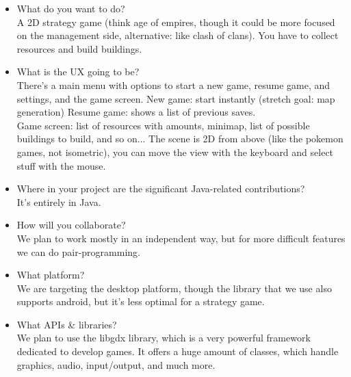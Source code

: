 \documentclass{article}
\begin{document}
  \begin{itemize}
    \item What do you want to do?\\
    A 2D strategy game (think age of empires, though it could be more focused on the management side, alternative: like clash of clans). You have to collect resources and build buildings.

    \item What is the UX going to be?\\
    There's a main menu with options to start a new game, resume game, and settings, and the game screen.
    New game: start instantly (stretch goal: map generation)
    Resume game: shows a list of previous saves.\\
    Game screen: list of resources with amounts, minimap, list of possible buildings to build, and so on...
    The scene is 2D from above (like the pokemon games, not isometric), you can move the view with the keyboard and select stuff with the mouse.

    \item Where in your project are the significant Java-related contributions?\\
    It's entirely in Java.

    \item How will you collaborate?\\
    We plan to work mostly in an independent way, but for more difficult features we can do pair-programming.

    \item What platform?\\
    We are targeting the desktop platform, though the library that we use also supports android, but it's less optimal for a strategy game.

    \item What APIs \& libraries?\\
    We plan to use the libgdx library, which is a very powerful framework dedicated to develop games. It offers a huge amount of classes, which handle graphics, audio, input/output, and much more.
  \end{itemize}
\end{document}
